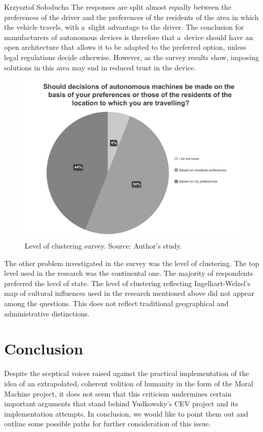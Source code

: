 \begin{artengenv}{Krzysztof Sołoducha}
The responses are split almost equally between the preferences of the driver and the preferences of the residents of the area in which the vehicle travels, with a~slight advantage to the driver. The conclusion for manufacturers of autonomous devices is therefore that a~device should have an open architecture that allows it to be adapted to the preferred option, unless legal regulations decide otherwise. However, as the survey results show, imposing solutions in this area may end in reduced trust in the device.
\begin{figure}
 \begin{center}
 \includegraphics[width=.8\textwidth]{ART_Soloducha/illustration2.pdf}%
 \end{center}%
 \caption{Level of clustering survey. Source: Author's study.}\label{sol-ill2}
\end{figure}

The other problem investigated in the survey was the level of clustering. The top level used in the research was the continental one. The majority of respondents preferred the level of state. The level of clustering reflecting Ingelhart-Welzel's map of cultural influences used in the research mentioned above did not appear among the questions. This does not reflect traditional geographical and administrative distinctions.
\enlargethispage{2\baselineskip}

\section*{Conclusion}
Despite the sceptical voices raised against the practical implementation of the idea of an extrapolated, coherent volition of humanity in the form of the Moral Machine project, it does not seem that this criticism undermines certain important arguments that stand behind Yudkowsky's CEV project and its implementation attempts. In conclusion, we would like to point them out and outline some possible paths for further consideration of this issue.


\end{artengenv}
